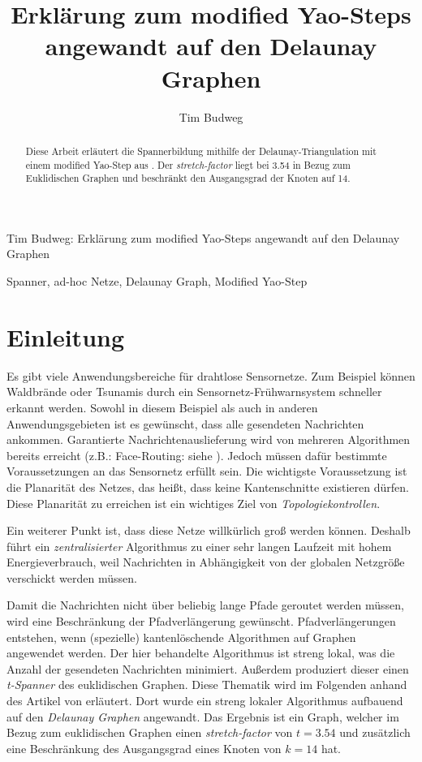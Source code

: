 \documentclass[a4paper,twoside]{IEEEtran}
\newcommand{\seminarteilnehmer}{Tim Budweg}
\newcommand{\seminartitel}{Erklärung zum modified Yao-Steps angewandt auf den Delaunay Graphen}
\begin{document}
\title{\seminartitel}
\author{\seminarteilnehmer}

%
{\seminarteilnehmer: \seminartitel}


\maketitle

\begin{abstract}
Diese Arbeit erläutert die Spannerbildung mithilfe der Delaunay-Triangulation mit einem modified Yao-Step aus \cite{kanj}. Der \textit{stretch-factor} liegt bei 3.54 in Bezug zum Euklidischen Graphen und beschränkt den Ausgangsgrad der Knoten auf 14.
\end{abstract}

\begin{IEEEkeywords}
Spanner, ad-hoc Netze, Delaunay Graph, Modified Yao-Step
\end{IEEEkeywords}


\section{Einleitung}
Es gibt viele Anwendungsbereiche für drahtlose Sensornetze. 
Zum Beispiel können Waldbrände oder Tsunamis durch ein Sensornetz-Frühwarnsystem schneller erkannt werden. 
Sowohl in diesem Beispiel als auch in anderen Anwendungsgebieten ist es gewünscht, dass alle gesendeten Nachrichten ankommen.
Garantierte Nachrichtenauslieferung wird von mehreren Algorithmen bereits erreicht (z.B.: Face-Routing: siehe \cite{FaceRouting}).
Jedoch müssen dafür bestimmte Voraussetzungen an das Sensornetz erfüllt sein. 
Die wichtigste Voraussetzung ist die Planarität des Netzes, das heißt, dass keine Kantenschnitte existieren dürfen. 
Diese Planarität zu erreichen ist ein wichtiges Ziel von \textit{Topologiekontrollen}.

Ein weiterer Punkt ist, dass diese Netze willkürlich groß werden können.
Deshalb führt ein \textit{zentralisierter} Algorithmus zu einer sehr langen Laufzeit mit hohem Energieverbrauch, weil Nachrichten in Abhängigkeit von der globalen Netzgröße verschickt werden müssen. 

Damit die Nachrichten nicht über beliebig lange Pfade geroutet werden müssen, wird eine Beschränkung der Pfadverlängerung gewünscht. 
Pfadverlängerungen entstehen, wenn (spezielle) kantenlöschende Algorithmen auf Graphen angewendet werden.
Der hier behandelte Algorithmus ist streng lokal, was die Anzahl der gesendeten Nachrichten minimiert.
Außerdem produziert dieser einen \textit{t-Spanner} des euklidischen Graphen.
Diese Thematik wird im Folgenden anhand des Artikel von \cite{kanj} erläutert.
Dort wurde ein streng lokaler Algorithmus aufbauend auf den \textit{Delaunay Graphen} angewandt.
Das Ergebnis ist ein Graph, welcher im Bezug zum euklidischen Graphen einen \textit{stretch-factor} von $t=3.54 $ und zusätzlich eine Beschränkung des Ausgangsgrad eines Knoten von $k=14 $ hat.
\end{document}
